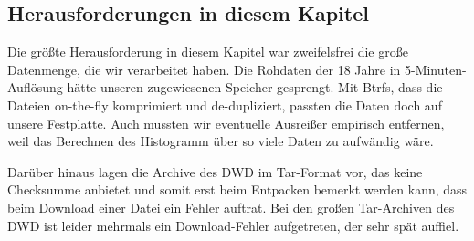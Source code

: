 \subsection{Herausforderungen in diesem Kapitel}
Die größte Herausforderung in diesem Kapitel war zweifelsfrei die große Datenmenge, die wir verarbeitet haben. Die Rohdaten der 18 Jahre in 5-Minuten-Auflösung hätte unseren zugewiesenen Speicher gesprengt. Mit Btrfs, dass die Dateien on-the-fly komprimiert und de-dupliziert, passten die Daten doch auf unsere Festplatte. Auch mussten wir eventuelle Ausreißer empirisch entfernen, weil das Berechnen des Histogramm über so viele Daten zu aufwändig wäre.

Darüber hinaus lagen die Archive des DWD im Tar-Format vor, das keine Checksumme anbietet und somit erst beim Entpacken bemerkt werden kann, dass beim Download einer Datei ein Fehler auftrat. Bei den großen Tar-Archiven des DWD ist leider mehrmals ein Download-Fehler aufgetreten, der sehr spät auffiel.

